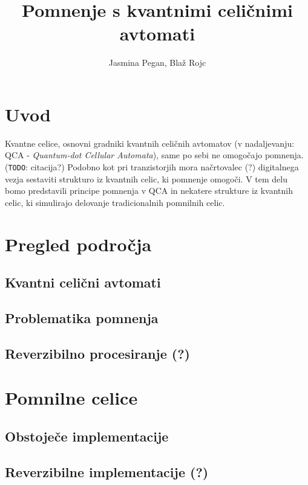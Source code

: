 \documentclass[a4paper, 12pt]{article}
\title{Pomnenje s kvantnimi celičnimi avtomati}
\author{Jasmina Pegan, Blaž Rojc}
\newcommand{\todo}{\texttt{TODO}} %
\begin{document}
\maketitle

\section{Uvod}

Kvantne celice, osnovni gradniki kvantnih celičnih avtomatov (v nadaljevanju: QCA - \emph{Quantum-dot Cellular Automata}), same po sebi ne omogočajo pomnenja. (\todo: citacija?)
Podobno kot pri tranzistorjih mora načrtovalec (?) digitalnega vezja sestaviti strukturo iz kvantnih celic, ki pomnenje omogoči.
V tem delu bomo predstavili principe pomnenja v QCA in nekatere strukture iz kvantnih celic, ki simulirajo delovanje tradicionalnih pomnilnih celic.



\section{Pregled področja}

\subsection{Kvantni celični avtomati}

\subsection{Problematika pomnenja}

\subsection{Reverzibilno procesiranje (?)}



\section{Pomnilne celice}

\subsection{Obstoječe implementacije}

\subsection{Reverzibilne implementacije (?)}
\end{document}
